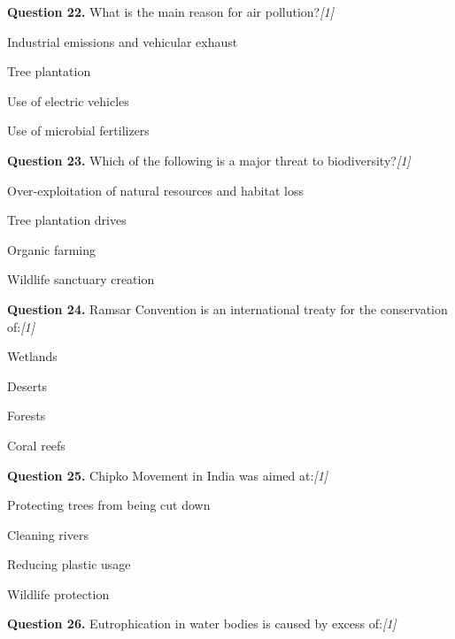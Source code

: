 \documentclass[11pt,a4paper]{article}
\newcommand{\pts}[1]{\hfill   \textit{[#1]}}
\begin{document}
\medskip


\noindent   \textbf{Question 22.} What is the main reason for air pollution?\pts{1}

\begin{parts}
  \item Industrial emissions and vehicular exhaust
  \item Tree plantation
  \item Use of electric vehicles
  \item Use of microbial fertilizers
\end{parts}

\medskip


\noindent   \textbf{Question 23.} Which of the following is a major threat to biodiversity?\pts{1}

\begin{parts}
  \item Over-exploitation of natural resources and habitat loss
  \item Tree plantation drives
  \item Organic farming
  \item Wildlife sanctuary creation
\end{parts}

\medskip


\noindent   \textbf{Question 24.} Ramsar Convention is an international treaty for the conservation of:\pts{1}

\begin{parts}
  \item Wetlands
  \item Deserts
  \item Forests
  \item Coral reefs
\end{parts}

\medskip


\noindent   \textbf{Question 25.} Chipko Movement in India was aimed at:\pts{1}

\begin{parts}
  \item Protecting trees from being cut down
  \item Cleaning rivers
  \item Reducing plastic usage
  \item Wildlife protection
\end{parts}

\medskip


\noindent   \textbf{Question 26.} Eutrophication in water bodies is caused by excess of:\pts{1}
\end{document}

